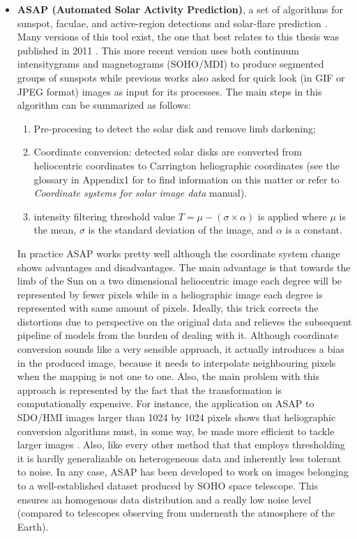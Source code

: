 \begin{itemize}
  \item \textbf{ASAP (Automated Solar Activity Prediction)}, a set of algorithms for sunspot, faculae, and active-region detections \cite{colak2008automated} and solar-flare prediction \cite{colak2009automated}. Many versions of this tool exist, the one that best relates to this thesis  was published in 2011 \cite{colak2011representation}. This more recent version uses both continuum intensitygrams and magnetograms (SOHO/MDI) to produce segmented groups of sunspots while previous works also asked for quick look (in GIF or JPEG format) images as input for its processes. The main steps in this algorithm can be summarized as follows:
  \begin{enumerate}
    \item Pre-procesing to detect the solar disk and remove limb darkening;
    \item Coordinate conversion: detected solar disks are converted from heliocentric coordinates to Carrington heliographic coordinates (see the glossary in Appendix1 for to find information on this matter or refer to \textit{Coordinate systems for solar image data} \cite{thompson2006coordinate} manual).
    \item intensity filtering threshold value $T = \mu - (\sigma \times \alpha)$ is applied where $\mu$ is the mean, $\sigma$ is the standard deviation of the image, and $\alpha$ is a constant.
  \end{enumerate}
  In practice ASAP works pretty well \cite{verbeeck2013multi} although the coordinate system change shows advantages and disadvantages. The main advantage is that towards the limb of the Sun on a two dimensional heliocentric image each degree will be represented by fewer pixels while in a heliographic image each degree is represented with same amount of pixels. Ideally, this trick corrects the distortions due to perspective on the original data and relieves the subsequent pipeline of models from the burden of dealing with it. Although coordinate conversion sounds like a very sensible approach, it actually introduces a bias in the produced image, because it needs to interpolate neighbouring pixels when the mapping is not one to one. Also, the main problem with this approach is represented by the fact that the transformation is computationally expensive. For instance, the application on ASAP to SDO/HMI images larger than 1024 by 1024 pixels shows that heliographic conversion algorithms must, in some way, be made more efficient to tackle larger images \cite{verbeeck2013multi}. Also, like every other method that that employs thresholding it is hardly generalizable on heterogeneous data and inherently less tolerant to noise. In any case, ASAP has been developed to work on images belonging to a well-established dataset produced by SOHO space telescope. This ensures an homogenous data distribution and a really low noise level (compared to telescopes observing from underneath the atmosphere of the Earth).

\end{itemize}
